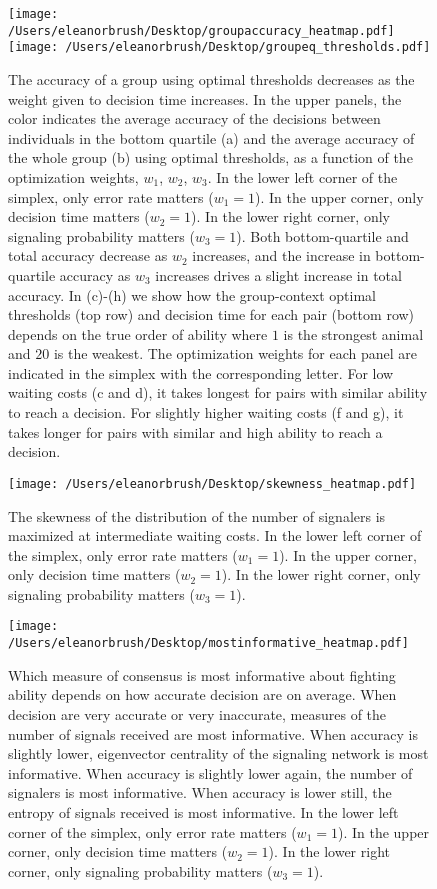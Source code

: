 \documentclass{article}
\begin{document}
\begin{figure}
\texttt{[image: /Users/eleanorbrush/Desktop/groupaccuracy\_heatmap.pdf]}
\texttt{[image: /Users/eleanorbrush/Desktop/groupeq\_thresholds.pdf]}
\caption{\label{groupeq_thresholds}   The accuracy of a group using optimal thresholds decreases as the weight given to decision time increases.  In the upper panels, the color indicates the average accuracy of the decisions between individuals in the bottom quartile (a) and the average accuracy of the whole group (b) using optimal thresholds, as a function of the optimization weights, $w_1$, $w_2$, $w_3$.  In the lower left corner of the simplex, only error rate matters ($w_1=1$).  In the upper corner, only decision time matters ($w_2=1$).  In the lower right corner, only signaling probability matters ($w_3=1$). Both bottom-quartile and total accuracy decrease as $w_2$ increases, and the increase in bottom-quartile accuracy as $w_3$ increases drives a slight increase in total accuracy.  In (c)-(h) we show how the group-context optimal thresholds (top row) and decision time for each pair (bottom row) depends on the true order of ability where $1$ is the strongest animal and $20$ is the weakest. The optimization weights for each panel are indicated in the simplex with the corresponding letter.  For low waiting costs (c and d), it takes longest for pairs with similar ability to reach a decision.  For slightly higher waiting costs (f and g), it takes longer for pairs with similar and high ability to reach a decision.}
\end{figure}

\begin{figure}[ht]
\texttt{[image: /Users/eleanorbrush/Desktop/skewness\_heatmap.pdf]}
\caption{\label{skewness} The skewness of the distribution of the number of signalers is maximized at intermediate waiting costs. In the lower left corner of the simplex, only error rate matters ($w_1=1$).  In the upper corner, only decision time matters ($w_2=1$).  In the lower right corner, only signaling probability matters ($w_3=1$).}
\end{figure}

\begin{figure}[ht]
\texttt{[image: /Users/eleanorbrush/Desktop/mostinformative\_heatmap.pdf]}
\caption{\label{bestmetric}  Which measure of consensus is most informative about fighting ability depends on how accurate decision are on average.  When decision are very accurate or very inaccurate, measures of the number of signals received are most informative.  When accuracy is slightly lower, eigenvector centrality of the signaling network is most informative.  When accuracy is slightly lower again, the number of signalers is most informative.  When accuracy is lower still, the entropy of signals received is most informative.  In the lower left corner of the simplex, only error rate matters ($w_1=1$).  In the upper corner, only decision time matters ($w_2=1$).  In the lower right corner, only signaling probability matters ($w_3=1$).}
\end{figure}
\end{document}
